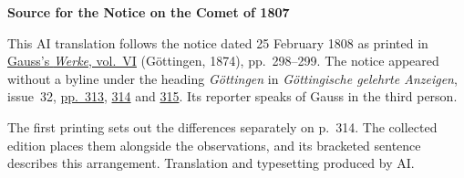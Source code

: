 \clearpage\thispagestyle{empty}
\begin{center}\textbf{Source for the Notice on the Comet of 1807}\end{center}
\noindent This AI translation follows the notice dated 25 February 1808 as printed in \href{https://gdz.sub.uni-goettingen.de/id/PPN236007467}{Gauss’s \textit{Werke}, vol.~VI} (Göttingen, 1874), pp.~298--299. The notice appeared without a byline under the heading \textit{Göttingen} in \textit{Göttingische gelehrte Anzeigen}, issue~32, \href{https://manifests.sub.uni-goettingen.de/iiif/image/gdz:PPN319721507_1808:00000317/full/1600,/0/default.jpg}{pp.~313}, \href{https://manifests.sub.uni-goettingen.de/iiif/image/gdz:PPN319721507_1808:00000318/full/1600,/0/default.jpg}{314} and \href{https://manifests.sub.uni-goettingen.de/iiif/image/gdz:PPN319721507_1808:00000319/full/1600,/0/default.jpg}{315}. Its reporter speaks of Gauss in the third person.
\par\medskip
The first printing sets out the differences separately on p.~314. The collected edition places them alongside the observations, and its bracketed sentence describes this arrangement. Translation and typesetting produced by AI.
\clearpage
